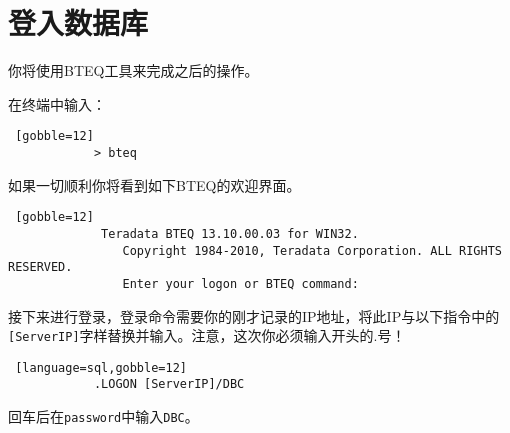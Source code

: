 \documentclass{article}
\begin{document}




	\section{登入数据库} %
		你将使用BTEQ工具来完成之后的操作。

		在终端中输入：

		\begin{lstlisting} [gobble=12]
			> bteq
		\end{lstlisting}

		如果一切顺利你将看到如下BTEQ的欢迎界面。
		\begin{lstlisting} [gobble=12]
			 Teradata BTEQ 13.10.00.03 for WIN32.
				Copyright 1984-2010, Teradata Corporation. ALL RIGHTS RESERVED.
				Enter your logon or BTEQ command:

		\end{lstlisting}

		接下来进行登录，登录命令需要你的刚才记录的IP地址，将此IP与以下指令中的\lstinline|[ServerIP]|字样替换并输入。注意，这次你必须输入开头的.号！

		\begin{lstlisting} [language=sql,gobble=12]
			.LOGON [ServerIP]/DBC
		\end{lstlisting}

		回车后在\lstinline|password|中输入\lstinline|DBC|。
\end{document}
